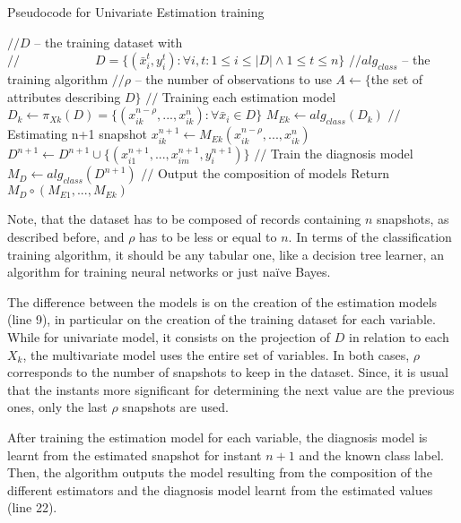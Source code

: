 \begin{algorithm}
\caption{Pseudocode for Univariate Estimation training}
\label{alg:uve}
\begin{algorithmic}[1]
	\State $// D$ – the training dataset with
	\State $// \qquad\qquad\qquad D = \{(\bar{x}_i^t,y_i^t ): \forall i,t:1 \leq i \leq |D| \wedge 1 \leq t \leq n\} $
	\State $// alg_{class}$ – the training algorithm
	\State $// \rho$ – the number of observations to use
    \State $A \leftarrow \{$the set of attributes describing $D\}$
	\Statex
	\State $//$ Training each estimation model
        \State $D_k \leftarrow \pi_{Xk} (D) = \{(x_{ik}^{n-\rho},...,x_{ik}^n ): \forall \bar{x}_i \in D\} $
		\State $M_{Ek} \leftarrow alg_{class}(D_k) $
	\EndFor
	\Statex
	\State $//$ Estimating n+1 snapshot
			\State $x_{ik}^{n+1} \leftarrow M_{Ek} (x_{ik}^{n-\rho},...,x_{ik}^n )$
			\State $ D^{n+1} \leftarrow D^{n+1} \cup \{(x_{i1}^{n+1},...,x_{im}^{n+1},y_i^{n+1} )\}$
		\EndFor
	\EndFor
	\Statex
	\State $//$ Train the diagnosis model
	\State $M_D \leftarrow  alg_{class}(D^{n+1})$
	\Statex
	\State $//$ Output the composition of models
	\State Return $M_D \circ (M_{E1},...,M_{Ek})$
\EndProcedure
\Statex
\end{algorithmic}
\end{algorithm}

Note, that the dataset has to be composed of records containing $n$ snapshots, as described before, and $\rho$ has to be less or equal to $n$. 
In terms of the classification training algorithm, it should be any tabular one, like a decision tree learner, an algorithm for
 training neural networks or just naïve Bayes.

The difference between the models is on the creation of the estimation models (line 9), in particular on the creation of the 
training dataset for each variable. While for univariate model, it consists on the projection of $D$ in relation to each $X_k$, the 
multivariate model uses the entire set of variables. In both cases, $\rho$ corresponds to the number of snapshots to keep in the dataset.
 Since, it is usual that the instants more significant for determining the next value are the previous ones, only the last $\rho$ snapshots are used.

After training the estimation model for each variable, the diagnosis model is learnt from the estimated snapshot for instant
 $n+1$ and the known class label. Then, the algorithm outputs the model resulting from the composition of the different
 estimators and the diagnosis model learnt from the estimated values (line 22).

